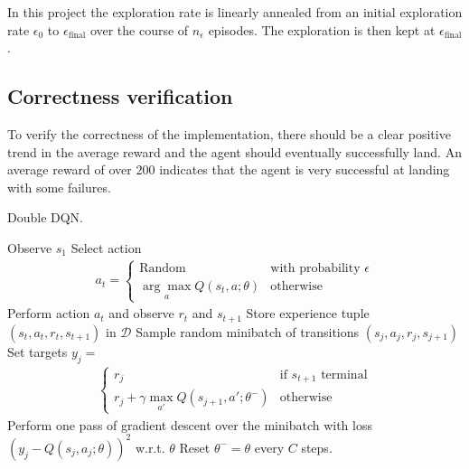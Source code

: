 \documentclass{article}
\begin{document}
In this project the exploration rate is linearly annealed from an initial exploration rate $\epsilon_0$ to $\epsilon_\text{final}$ over the course of $n_\epsilon$ episodes. The exploration is then kept at $\epsilon_\text{final}$.

\subsection{Correctness verification}
To verify the correctness of the implementation, there should be a clear positive trend in the average reward and the agent should eventually successfully land. An average reward of over $200$ indicates that the agent is very successful at landing with some failures.

\begin{algorithm}[tb]
   \caption{Double DQN.}
   \label{alg:ddqn}
\begin{algorithmic}[1]
    \STATE Observe $s_1$
      \STATE Select action
      \begin{align*}
        a_t = \begin{cases}
          \text{Random} & \text{with probability } \epsilon \\
          \underset{a}{\arg \max} Q(s_t, a; \theta) & \text{otherwise}
        \end{cases}
      \end{align*}
      \STATE Perform action $a_t$ and observe $r_t$ and $s_{t+1}$
      \STATE Store experience tuple $(s_{t}, a_{t}, r_{t}, s_{t+1})$ in $\mathcal{D}$
      \STATE Sample random minibatch of transitions $(s_j, a_j, r_j, s_{j+1})$
      \STATE Set targets $y_j = $
      \begin{align*}
        \begin{cases}
          r_j & \text{if } s_{t+1} \text{ terminal} \\
          r_j + \gamma \max_{a'} Q(s_{j+1}, a'; \theta^{-}) & \text{otherwise}
        \end{cases}
      \end{align*}
      \STATE Perform one pass of gradient descent over the minibatch with loss $(y_j - Q(s_j, a_j; \theta))^2$ w.r.t. $\theta$
      \STATE Reset $\theta^{-} = \theta$ every $C$ steps.
    \ENDFOR
  \ENDFOR
\end{algorithmic}
\end{algorithm}
\end{document}
